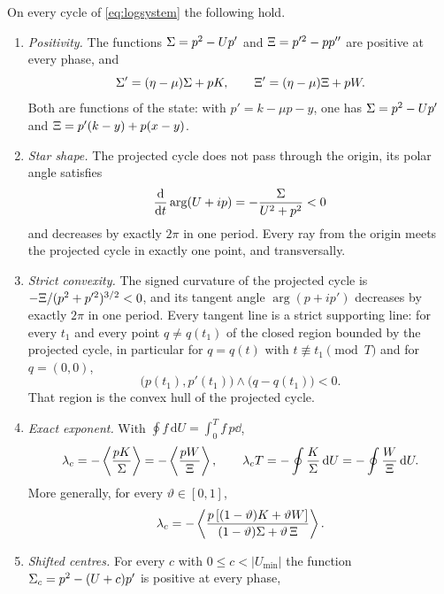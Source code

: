 \begin{theorem}\label{thm:gauges}
On every cycle of \eqref{eq:logsystem} the following hold.
\begin{enumerate}[label=(\roman*)]
\item \emph{Positivity.} The functions $\Sigma=p^2-Up'$ and $\Xi=p'^2-pp''$ are positive at every phase, and
\begin{equation}\label{eq:gaugeodes}
\Sigma'=(\eta-\mu)\Sigma+pK,\qquad \Xi'=(\eta-\mu)\Xi+pW .
\end{equation}
Both are functions of the state: with $p'=k-\mu p-y$, one has $\Sigma=p^2-Up'$ and $\Xi=p'(k-y)+p(x-y)$.
\item \emph{Star shape.} The projected cycle does not pass through the origin, its polar angle satisfies
\[
\frac{\mathrm d}{\mathrm dt}\arg(U+ip)=-\frac{\Sigma}{U^2+p^2}<0
\]
and decreases by exactly $2\pi$ in one period. Every ray from the origin meets the projected cycle in exactly one point, and transversally.
\item \emph{Strict convexity.} The signed curvature of the projected cycle is $-\Xi/(p^2+p'^2)^{3/2}<0$, and its tangent angle $\arg(p+ip')$ decreases by exactly $2\pi$ in one period. Every tangent line is a strict supporting line: for every $t_1$ and every point $q\ne q(t_1)$ of the closed region bounded by the projected cycle, in particular for $q=q(t)$ with $t\not\equiv t_1\pmod T$ and for $q=(0,0)$,
\begin{equation}\label{gau:supportline}
\bigl(p(t_1),p'(t_1)\bigr)\wedge\bigl(q-q(t_1)\bigr)<0 .
\end{equation}
That region is the convex hull of the projected cycle.
\item \emph{Exact exponent.} With $\oint f\,\mathrm dU=\int_0^Tf\,p\dd$,
\begin{equation}\label{eq:exactexponent}
\lambda_c=-\left\langle \frac{pK}{\Sigma}\right\rangle=-\left\langle \frac{pW}{\Xi}\right\rangle,\qquad
\lambda_cT=-\oint\frac{K}{\Sigma}\,\mathrm dU=-\oint\frac{W}{\Xi}\,\mathrm dU .
\end{equation}
More generally, for every $\vartheta\in[0,1]$,
\begin{equation}\label{gau:mixedexponent}
\lambda_c=-\left\langle \frac{p\,[(1-\vartheta)K+\vartheta W]}{(1-\vartheta)\Sigma+\vartheta\,\Xi}\right\rangle .
\end{equation}
\item \emph{Shifted centres.} For every $c$ with $0\le c<|U_{\min}|$ the function $\Sigma_c=p^2-(U+c)p'$ is positive at every phase,
\begin{equation}\label{gau:shifted}

\end{equation}
\end{enumerate}
\end{theorem}
